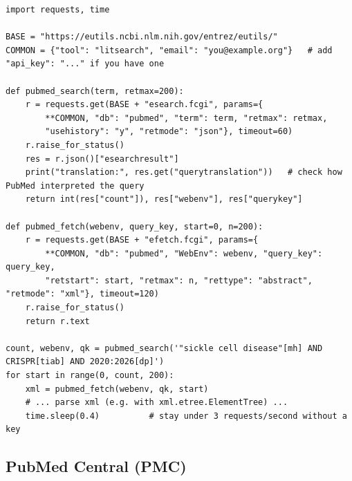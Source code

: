 \documentclass[11pt,a4paper]{article}
\begin{document}
\begin{lstlisting}[caption={PubMed: поиск через ESearch и выгрузка через EFetch с history server}]
import requests, time

BASE = "https://eutils.ncbi.nlm.nih.gov/entrez/eutils/"
COMMON = {"tool": "litsearch", "email": "you@example.org"}   # add "api_key": "..." if you have one

def pubmed_search(term, retmax=200):
    r = requests.get(BASE + "esearch.fcgi", params={
        **COMMON, "db": "pubmed", "term": term, "retmax": retmax,
        "usehistory": "y", "retmode": "json"}, timeout=60)
    r.raise_for_status()
    res = r.json()["esearchresult"]
    print("translation:", res.get("querytranslation"))   # check how PubMed interpreted the query
    return int(res["count"]), res["webenv"], res["querykey"]

def pubmed_fetch(webenv, query_key, start=0, n=200):
    r = requests.get(BASE + "efetch.fcgi", params={
        **COMMON, "db": "pubmed", "WebEnv": webenv, "query_key": query_key,
        "retstart": start, "retmax": n, "rettype": "abstract", "retmode": "xml"}, timeout=120)
    r.raise_for_status()
    return r.text

count, webenv, qk = pubmed_search('"sickle cell disease"[mh] AND CRISPR[tiab] AND 2020:2026[dp]')
for start in range(0, count, 200):
    xml = pubmed_fetch(webenv, qk, start)
    # ... parse xml (e.g. with xml.etree.ElementTree) ...
    time.sleep(0.4)          # stay under 3 requests/second without a key
\end{lstlisting}

\subsection{PubMed Central (PMC)}
\end{document}
